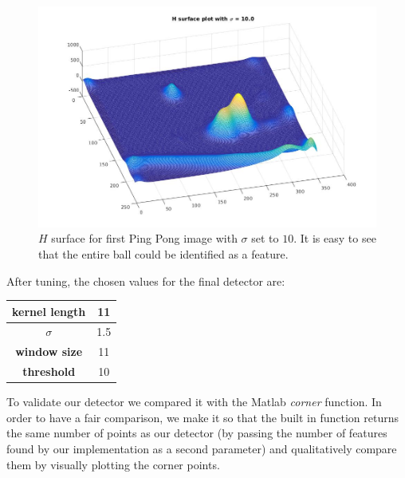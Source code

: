 \documentclass[11pt]{article}
\begin{document}
\begin{figure}[H] \centering
	\includegraphics[width=.8\textwidth]{imgs/surface_pingpong_s10.jpg}
	\caption{$H$ surface for first Ping Pong image with $\sigma$ set to $10$. It is
	easy to see that the entire ball could be identified as a feature.}
	\label{fig:surface_pingpong_s10}
\end{figure}

After tuning, the chosen values for the final detector are:

\begin{center}
	\begin{tabular}{| c | c |}
		\hline
		\textbf{kernel length} & 11   \\ \hline
		\textbf{$\sigma$}      & 1.5  \\ \hline
		\textbf{window size}   & 11   \\ \hline
		\textbf{threshold}     & 10   \\
		\hline
	\end{tabular}
\end{center}

To validate our detector we compared it with the Matlab \emph{corner} function. In
order to have a fair comparison, we make it so that the built in function
returns the same number of points as our detector (by passing the number of
features found by our implementation as a second parameter) and qualitatively
compare them by visually plotting the corner points.
 
\end{document}
